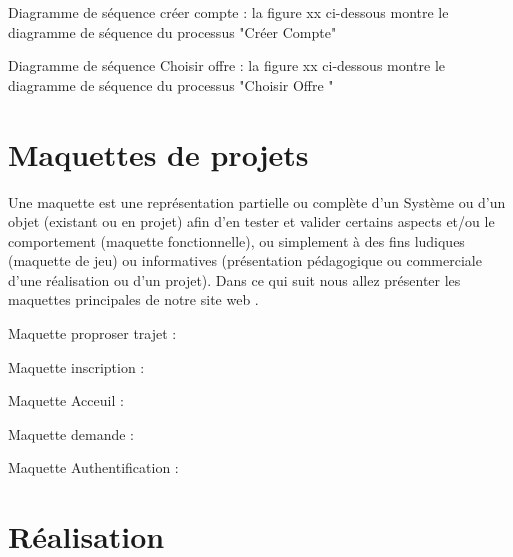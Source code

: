 \documentclass[a4paper]{report}
\begin{document}
\begin{spacing}{2}
Diagramme de séquence créer compte :
la figure xx ci-dessous montre le diagramme de séquence du processus "Créer Compte"


 








Diagramme de séquence Choisir offre :
la figure xx ci-dessous montre le diagramme de séquence du processus "Choisir Offre "

 


\chapter{Maquettes de projets}
	
Une maquette est une représentation partielle ou complète d'un Système ou d'un objet (existant ou en projet) afin d'en tester et valider certains aspects et/ou le comportement (maquette fonctionnelle), ou simplement à des fins ludiques (maquette de jeu) ou informatives (présentation pédagogique ou commerciale d'une réalisation ou d'un projet).
Dans ce qui suit nous allez présenter les maquettes principales de notre site web .

Maquette proproser trajet :

 


Maquette inscription :
 



Maquette Acceuil  :
 


Maquette demande :
 



Maquette Authentification :

 



\chapter{Réalisation}


\end{spacing}
\end{document}
